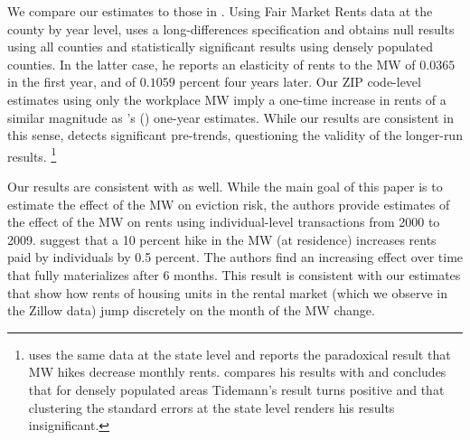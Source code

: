 We compare our estimates to those in \textcite{Yamagishi2019, AgarwalEtAl2021}.
Using Fair Market Rents data at the county by year level, 
\textcite[][, Tables 1 and 2]{Yamagishi2019} uses a long-differences 
specification and obtains null results using all counties and statistically 
significant results using densely populated counties.
In the latter case, he reports an elasticity of rents to the MW of $0.0365$
in the first year, and of $0.1059$ percent four years later.
Our ZIP code-level estimates using only the workplace MW imply a one-time 
increase in rents of a similar magnitude as \citeauthor{Yamagishi2019}'s 
(\citeyear[][Table 2, Column 1]{Yamagishi2019}) one-year estimates.
While our results are consistent in this sense, 
\textcite[][Table 3]{Yamagishi2019} detects significant pre-trends,
questioning the validity of the longer-run results.%
\footnote{\textcite{Tidemann2018} uses the same data at the state level and 
reports the paradoxical result that MW hikes decrease monthly rents.
\textcite[][, Appendix C.1.3.]{Yamagishi2019} compares his results with 
\textcite{Tidemann2018} and concludes that for densely populated areas 
Tidemann's result turns positive and that clustering the standard errors at the
state level renders his results insignificant.}

Our results are consistent with \textcite{AgarwalEtAl2021} as well.
While the main goal of this paper is to estimate the effect of the MW on eviction
risk, the authors provide estimates of the effect of the MW on rents using
individual-level transactions from 2000 to 2009.
\textcite[][, Figure 4]{AgarwalEtAl2021} suggest that a 10 percent hike 
in the MW (at residence) increases rents paid by individuals by 0.5 percent.
The authors find an increasing effect over time that fully materializes after 
6 months.
This result is consistent with our estimates that show how rents of housing 
units in the rental market (which we observe in the Zillow data) jump 
discretely on the month of the MW change.
